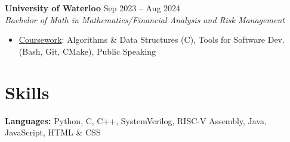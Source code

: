 \documentclass[10pt,letterpaper]{article}
\begin{document}

\raggedright
\textbf{University of Waterloo} \hfill
Sep 2023 -- Aug 2024 \\
\textit{Bachelor of Math in Mathematics/Financial Analysis and Risk Management} \hfill
\begin{itemize}
    \item \underline{Coursework}: 
    Algorithms \& Data Structures (C), 
    Tools for Software Dev. (Bash, Git, CMake), 
    Public Speaking
\end{itemize}













\section{Skills}

\hspace{0.75em}\textbf{Languages:} 
    Python, C, C++, SystemVerilog, RISC-V Assembly, Java, JavaScript, HTML \& CSS \\
\end{document}
